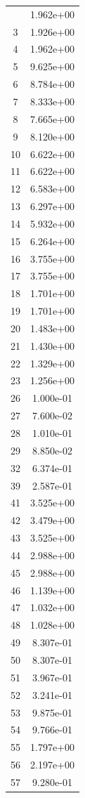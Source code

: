 \documentclass[12pt]{article}
\begin{document}
\begin{longtable}{@{}cc@{}}
\bottomrule
\endlastfoot
2 & 1.962e+00 \\
3 & 1.926e+00 \\
4 & 1.962e+00 \\
5 & 9.625e+00 \\
6 & 8.784e+00 \\
7 & 8.333e+00 \\
8 & 7.665e+00 \\
9 & 8.120e+00 \\
10 & 6.622e+00 \\
11 & 6.622e+00 \\
12 & 6.583e+00 \\
13 & 6.297e+00 \\
14 & 5.932e+00 \\
15 & 6.264e+00 \\
16 & 3.755e+00 \\
17 & 3.755e+00 \\
18 & 1.701e+00 \\
19 & 1.701e+00 \\
20 & 1.483e+00 \\
21 & 1.430e+00 \\
22 & 1.329e+00 \\
23 & 1.256e+00 \\
26 & 1.000e-01 \\
27 & 7.600e-02 \\
28 & 1.010e-01 \\
29 & 8.850e-02 \\
32 & 6.374e-01 \\
39 & 2.587e-01 \\
41 & 3.525e+00 \\
42 & 3.479e+00 \\
43 & 3.525e+00 \\
44 & 2.988e+00 \\
45 & 2.988e+00 \\
46 & 1.139e+00 \\
47 & 1.032e+00 \\
48 & 1.028e+00 \\
49 & 8.307e-01 \\
50 & 8.307e-01 \\
51 & 3.967e-01 \\
52 & 3.241e-01 \\
53 & 9.875e-01 \\
54 & 9.766e-01 \\
55 & 1.797e+00 \\
56 & 2.197e+00 \\
57 & 9.280e-01 \\

\end{longtable}
\end{document}
